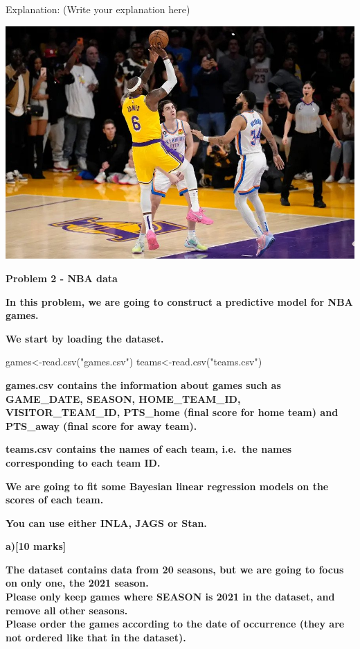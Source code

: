 \documentclass[
]{article}
\newenvironment{Shaded}{\begin{snugshade}}{\end{snugshade}}
\newcommand{\FunctionTok}[1]{\textcolor[rgb]{0.00,0.00,0.00}{#1}}
\newcommand{\NormalTok}[1]{#1}
\newcommand{\OtherTok}[1]{\textcolor[rgb]{0.56,0.35,0.01}{#1}}
\newcommand{\StringTok}[1]{\textcolor[rgb]{0.31,0.60,0.02}{#1}}
\begin{document}
Explanation: (Write your explanation here)

\includegraphics{nba.jpg}

\textbf{Problem 2 - NBA data}

\textbf{In this problem, we are going to construct a predictive model
for NBA games.}

\textbf{We start by loading the dataset.}

\begin{Shaded}
\begin{Highlighting}[]
\NormalTok{games}\OtherTok{\textless{}{-}}\FunctionTok{read.csv}\NormalTok{(}\StringTok{"games.csv"}\NormalTok{)}
\NormalTok{teams}\OtherTok{\textless{}{-}}\FunctionTok{read.csv}\NormalTok{(}\StringTok{"teams.csv"}\NormalTok{)}
\end{Highlighting}
\end{Shaded}

\textbf{games.csv contains the information about games such as
GAME\_DATE, SEASON, HOME\_TEAM\_ID, VISITOR\_TEAM\_ID, PTS\_home (final
score for home team) and PTS\_away (final score for away team).}

\textbf{teams.csv contains the names of each team, i.e.~the names
corresponding to each team ID.}

\textbf{We are going to fit some Bayesian linear regression models on
the scores of each team.}

\textbf{You can use either INLA, JAGS or Stan.}

\textbf{a){[}10 marks{]}}

\textbf{The dataset contains data from 20 seasons, but we are going to
focus on only one, the 2021 season.\\
Please only keep games where SEASON is 2021 in the dataset, and remove
all other seasons.\\
Please order the games according to the date of occurrence (they are not
ordered like that in the dataset).}
\end{document}
